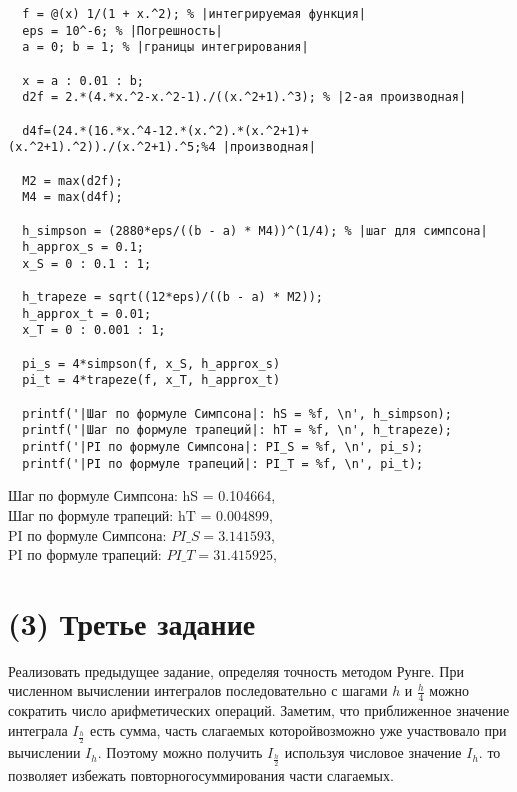 \begin{lstlisting}
  f = @(x) 1/(1 + x.^2); % |интегрируемая функция|
  eps = 10^-6; % |Погрешность|
  a = 0; b = 1; % |границы интегрирования|

  x = a : 0.01 : b;
  d2f = 2.*(4.*x.^2-x.^2-1)./((x.^2+1).^3); % |2-ая производная|

  d4f=(24.*(16.*x.^4-12.*(x.^2).*(x.^2+1)+(x.^2+1).^2))./(x.^2+1).^5;%4 |производная|

  M2 = max(d2f);
  M4 = max(d4f);

  h_simpson = (2880*eps/((b - a) * M4))^(1/4); % |шаг для симпсона|
  h_approx_s = 0.1;
  x_S = 0 : 0.1 : 1;

  h_trapeze = sqrt((12*eps)/((b - a) * M2));
  h_approx_t = 0.01;
  x_T = 0 : 0.001 : 1;

  pi_s = 4*simpson(f, x_S, h_approx_s)
  pi_t = 4*trapeze(f, x_T, h_approx_t)

  printf('|Шаг по формуле Симпсона|: hS = %f, \n', h_simpson);
  printf('|Шаг по формуле трапеций|: hT = %f, \n', h_trapeze);
  printf('|PI по формуле Симпсона|: PI_S = %f, \n', pi_s);
  printf('|PI по формуле трапеций|: PI_T = %f, \n', pi_t);
\end{lstlisting}
Шаг по формуле Симпсона: hS = 0.104664,\\
Шаг по формуле трапеций: hT = 0.004899,\\
PI по формуле Симпсона: $PI\_S  = 3.141593$,\\
PI по формуле трапеций: $PI\_T  = 31.415925$,\\

\section{(3) Третье задание}
Реализовать предыдущее задание, определяя точность методом Рунге. При численном вычислении интегралов последовательно с шагами $h$ и $\frac{h}{4}$ можно сократить число арифметических операций. Заметим, что приближенное значение интеграла $I_{\frac{h}{2}}$ есть сумма, часть слагаемых которойвозможно уже участвовало при вычислении $I_{h}$. Поэтому можно получить $I_{\frac{h}{2}}$ используя числовое значение $I_{h}$. то позволяет избежать повторногосуммирования части слагаемых.
